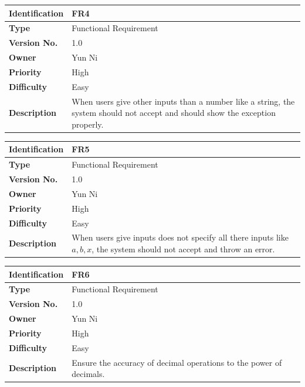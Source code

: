 \documentclass[11pt]{article}
\begin{document}
\begin{center}
    \begin{tabular}{|p{3cm}|p{11cm}| }
    \hline
    \textbf{Identification} &  FR4 \\ \hline 
    \textbf{Type} & Functional Requirement\\ \hline 
    \textbf{Version No.} &  1.0 \\ \hline 
    \textbf{Owner} &  Yun Ni \\ \hline 
    \textbf{Priority} & High  \\ \hline
    \textbf{Difficulty} & Easy  \\ \hline
    \textbf{Description} & When users give other inputs than a number like a string, the system should not accept and should show the exception properly.\\ \hline
\end{tabular}
\end{center}

\begin{center}
    \begin{tabular}{|p{3cm}|p{11cm}| }
    \hline
    \textbf{Identification} &  FR5 \\ \hline 
    \textbf{Type} & Functional Requirement\\ \hline
    \textbf{Version No.} &  1.0 \\ \hline 
    \textbf{Owner} &  Yun Ni \\ \hline 
    \textbf{Priority} & High  \\ \hline
    \textbf{Difficulty} & Easy  \\ \hline
    \textbf{Description} & When users give inputs does not specify all there inputs like $a, b, x$, the system should not accept and throw an error.\\ \hline
\end{tabular}
\end{center}

\begin{center}
    \begin{tabular}{|p{3cm}|p{11cm}| }
    \hline
    \textbf{Identification} &  FR6 \\ \hline 
    \textbf{Type} & Functional Requirement\\ \hline
    \textbf{Version No.} &  1.0 \\ \hline 
    \textbf{Owner} &  Yun Ni \\ \hline 
    \textbf{Priority} & High  \\ \hline
    \textbf{Difficulty} & Easy  \\ \hline
    \textbf{Description} &Ensure the accuracy of decimal operations to the power of decimals.\\ \hline
\end{tabular}
\end{center}
\end{document}
